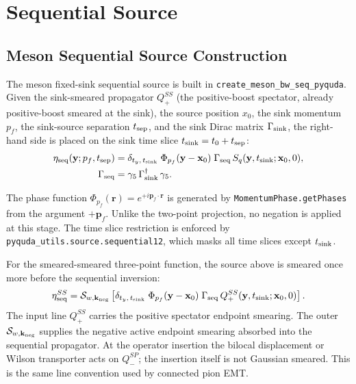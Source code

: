 \documentclass[11pt,a4paper]{article}
\begin{document}
\section{Sequential Source}
\label{sec:sequential}

\subsection{Meson Sequential Source Construction}

The meson fixed-sink sequential source is built in
\verb|create_meson_bw_seq_pyquda|.  Given the sink-smeared propagator
$Q_+^{SS}$ (the positive-boost spectator, already positive-boost smeared at
the sink), the source
position $x_0$, the sink momentum $p_f$, the sink-source separation $t_{\rm
sep}$, and the sink Dirac matrix $\Gamma_{\rm sink}$, the right-hand side is
placed on the sink time slice $t_{\rm sink} = t_0 + t_{\rm sep}$:
\begin{align}
  \eta_{\rm seq}(\mathbf{y}; p_f, t_{\rm sep})
  &=
  \delta_{t_y,\, t_{\rm sink}}\;
  \Phi_{p_f}(\mathbf{y} - \mathbf{x}_0)\;
  \Gamma_{\rm seq}\,
  S_q(\mathbf{y},t_{\rm sink}; \mathbf{x}_0,0),
  \label{eq:eta_seq}
  \\
  \Gamma_{\rm seq}
  &=
  \gamma_5\, \Gamma_{\rm sink}^\dagger\, \gamma_5.
  \label{eq:gamma_seq}
\end{align}

The phase function $\Phi_{p_f}(\mathbf{r}) = e^{+i\mathbf{p}_f\cdot
\mathbf{r}}$ is generated by \texttt{MomentumPhase.getPhases} from the
argument $+\mathbf p_f$.  Unlike the two-point projection, no negation is
applied at this stage.  The time slice restriction is
enforced by \verb|pyquda_utils.source.sequential12|, which masks all time
slices except $t_{\rm sink}$.

For the smeared-smeared three-point function, the source above is smeared once
more before the sequential inversion:
\begin{equation}
  \eta_{\rm seq}^{SS}
  =
  \mathcal{S}_{w,\mathbf{k}_{\rm neg}}
  \left[
    \delta_{t_y,\, t_{\rm sink}}\;
    \Phi_{p_f}(\mathbf{y}-\mathbf{x}_0)\;
    \Gamma_{\rm seq}\,
    Q_+^{SS}(\mathbf{y},t_{\rm sink};\mathbf{x}_0,0)
  \right].
  \label{eq:qtmd_eta_seq_smear}
\end{equation}
The input line $Q_+^{SS}$ carries the positive spectator endpoint smearing.
The outer $\mathcal{S}_{w,\mathbf{k}_{\rm neg}}$ supplies the negative active
endpoint smearing absorbed into the sequential propagator.  At the operator
insertion the bilocal displacement or Wilson transporter acts on
$Q_-^{SP}$; the insertion itself is not Gaussian smeared.  This is the same
line convention used by connected pion EMT.
\end{document}
